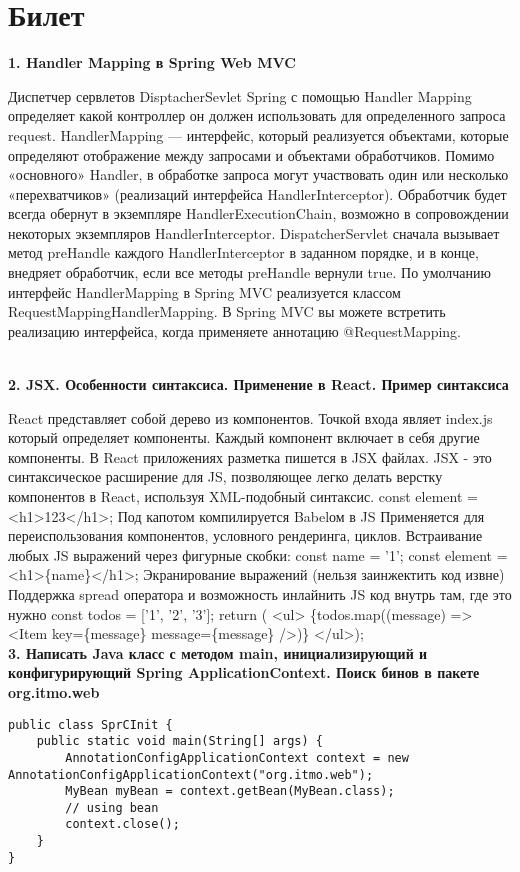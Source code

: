 \documentclass{article}
\newcommand{\bil}[5]{%
        \section{Билет}
        \textbf{1. #1}

        #4
        \\
        \textbf{2. #2}
        
        #5
        \\
        \textbf{3. #3}
}
\begin{document}
\bil{Handler Mapping в Spring Web MVC}{JSX. Особенности синтаксиса. Применение в React. Пример синтаксиса}
{Написать Java класс с методом main, инициализирующий и конфигурирующий Spring ApplicationContext. Поиск бинов в пакете org.itmo.web}{
    Диспетчер сервлетов DisptacherSevlet Spring с помощью Handler Mapping определяет какой контроллер он должен использовать для определенного запроса request.
    HandlerMapping — интерфейс, который реализуется объектами, которые определяют отображение между запросами и объектами обработчиков.
    Помимо «основного» Handler, в обработке запроса могут участвовать один или несколько «перехватчиков» (реализаций интерфейса HandlerInterceptor). 
    Обработчик будет всегда обернут в экземпляре HandlerExecutionChain, возможно в сопровождении некоторых экземпляров HandlerInterceptor. 
    DispatcherServlet сначала вызывает метод preHandle каждого HandlerInterceptor в заданном порядке, и в конце, внедряет обработчик, если все методы preHandle вернули true.
    По умолчанию интерфейс HandlerMapping в Spring MVC реализуется классом RequestMappingHandlerMapping.
    В Spring MVC вы можете встретить реализацию интерфейса, когда применяете аннотацию @RequestMapping. 
}{
    React представляет собой дерево из компонентов. Точкой входа являет index.js который определяет компоненты. 
    Каждый компонент включает в себя другие компоненты. 
    В React приложениях разметка пишется в JSX файлах.
    JSX - это синтаксическое расширение для JS, позволяющее легко делать верстку компонентов в React, используя XML-подобный синтаксис.
    const element = <h1>123</h1>;
    Под капотом компилируется Babelом в JS
    Применяется для переиспользования компонентов, условного рендеринга, циклов.
    Встраивание любых JS выражений через фигурные скобки:
    const name = '1';
    const element = <h1>\{name\}</h1>;
    Экранирование выражений (нельзя заинжектить код извне)
    Поддержка spread оператора и возможность инлайнить JS код внутрь там, где это нужно
    const todos = ['1', '2', '3'];
    return (
        <ul>
            \{todos.map((message) => <Item key=\{message\} message=\{message\} />)\}
        </ul>);}
\begin{lstlisting}[frame=single, basicstyle=\ttfamily, breaklines=true, breakatwhitespace=true, postbreak=\mbox{\textcolor{red}{$\hookrightarrow$}\space}]
    public class SprCInit {
    public static void main(String[] args) {
        AnnotationConfigApplicationContext context = new AnnotationConfigApplicationContext("org.itmo.web");
        MyBean myBean = context.getBean(MyBean.class);
        // using bean
        context.close();
    }
}
\end{lstlisting}
\end{document}
